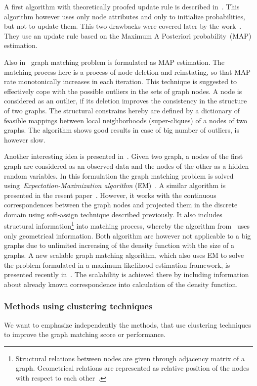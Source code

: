 A first algorithm with theoretically proofed update rule is described in~\cite{Hancock_Kittler}. This algorithm however uses only node attributes and only to initialize probabilities, but not to update them. This two drawbacks were covered later by the work~\cite{Christmas1995}. They use an update rule based on the Maximum A Posteriori probability~(MAP) estimation. 

Also in~\cite{Hancock_StrucMatch} graph matching problem is formulated as MAP estimation. The matching process here is a process of node deletion and reinstating, so that MAP rate monotonically increases in each iteration. This technique is suggested to effectively cope with the possible outliers in the sets of graph nodes. A node is considered as an outlier, if its deletion improves the consistency in the structure of two graphs. The structural constrains hereby are defined by a dictionary of feasible mappings between local neighborhoods (super-cliques) of a nodes of two graphs. The algorithm shows good results in case of big number of outliers, is however slow.

Another interesting idea is presented in~\cite{Hancock_EM_SVD}. Given two graph, a nodes of the first graph are considered as an observed data and the nodes of the other as a hidden random variables. In this formulation the graph matching problem is solved using~\emph{Expectation-Maximization algorithm} (EM)~\cite{EM_Dempster1977}. A similar algorithm is presented in the resent paper~\cite{Sanrom2012}. However, it works with the continuous correspondences between the graph nodes and projected them in the discrete domain using soft-assign technique described previously. It also includes structural information\footnote{Structural relations between nodes are given through adjacency matrix of a graph. Geometrical relations are represented as relative position of the nodes with respect to each other~\cite{Sanrom2012}.} into matching process, whereby the algorithm from~\cite{Hancock_EM_SVD} uses only geometrical information. Both algorithm are however not applicable to a big graphs due to unlimited increasing of the density function with the size of a graphs. A new scalable graph matching algorithm, which also uses EM to solve the problem formulated in a maximum likelihood estimation framework, is presented recently in~\cite{Armiti2014}. The scalability is achieved there by including information about already known correspondence into calculation of the density function.

\subsubsection{Methods using clustering techniques}
We want to emphasize independently the methods, that use clustering techniques to improve the graph matching score or performance.

